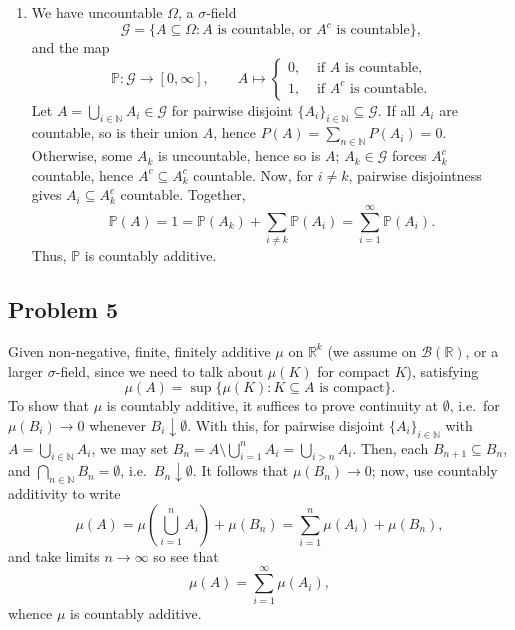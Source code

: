 \documentclass[11pt]{article}
\newcommand{\N}{\mathbb{N}}
\newcommand{\R}{\mathbb{R}}
\begin{document}
\begin{enumerate}
        \item We have uncountable $\Omega$, a $\sigma$-field \[
            \mathcal{G} = \{A \subseteq \Omega\colon A \text{ is countable, or } A^c \text{ is countable}\},
        \] and the map \[
            \mathbb{P}\colon \mathcal{G} \to [0, \infty], \qquad
            A \mapsto \begin{cases}
                0, &\text{ if } A \text{ is countable}, \\
                1, &\text{ if } A^c \text{ is countable}.
            \end{cases}
        \] Let $A = \bigcup_{i \in \N} A_i \in \mathcal{G}$ for pairwise
        disjoint $\{A_i\}_{i \in \N} \subseteq \mathcal{G}$.
        If all $A_i$ are countable, so is their union $A$, hence $P(A) =
        \sum_{n \in \N} P(A_i) = 0$.
        Otherwise, some $A_k$ is uncountable, hence so is $A$; $A_k \in
        \mathcal{G}$ forces $A_k^c$ countable, hence $A^c \subseteq A_k^c$
        countable.
        Now, for $i \neq k$, pairwise disjointness gives $A_i \subseteq A_k^c$
        countable.
        Together, \[
            \mathbb{P}(A) = 1 = \mathbb{P}(A_k) + \sum_{i \neq k}
            \mathbb{P}(A_i) = \sum_{i = 1}^\infty \mathbb{P}(A_i).
        \] Thus, $\mathbb{P}$ is countably additive.
    \end{enumerate}




    \subsection*{Problem 5}

    Given non-negative, finite, finitely additive $\mu$ on $\R^k$ (we assume
    on $\mathcal{B}(\R)$, or a larger $\sigma$-field, since we need to talk
    about $\mu(K)$ for compact $K$), satisfying \[
        \mu(A) = \sup \{\mu(K)\colon K \subseteq A\text{ is compact}\}.
    \] To show that $\mu$ is countably additive, it suffices to prove
    continuity at $\emptyset$, i.e.\ for $\mu(B_i) \to 0$ whenever $B_i
    \downarrow \emptyset$.
    With this, for pairwise disjoint $\{A_i\}_{i \in \N}$ with $A = \bigcup_{i
    \in \N} A_i$, we may set $B_n = A\setminus \bigcup_{i = 1}^n A_i =
    \bigcup_{i > n} A_i$. Then, each $B_{n + 1} \subseteq B_n$, and
    $\bigcap_{n \in \N} B_n = \emptyset$, i.e.\ $B_n \downarrow \emptyset$.
    It follows that $\mu(B_n) \to 0$; now, use countably additivity to write \[
        \mu(A) = \mu\left(\bigcup_{i = 1}^n A_i\right) + \mu(B_n)
            = \sum_{i = 1}^n \mu(A_i) + \mu(B_n),
    \] and take limits $n \to \infty$ so see that \[
        \mu(A) = \sum_{i = 1}^\infty \mu(A_i),
    \] whence $\mu$ is countably additive.
\end{document}

